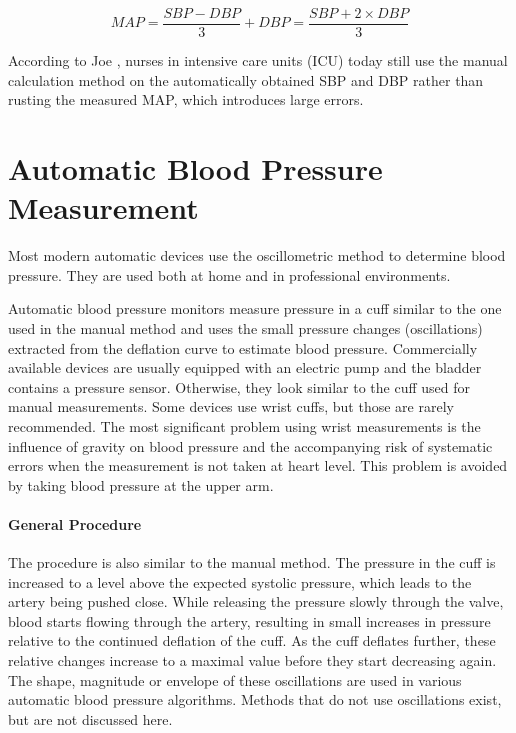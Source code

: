 \begin{equation}
\label{eq:MAP}
MAP = \frac{SBP-DBP}{3}+DBP = \frac{SBP+2\times DBP}{3}
\end{equation}

According to Joe \cite{Joe2019}, nurses in intensive care units (ICU) today still use the manual calculation method on the automatically obtained SBP and DBP rather than rusting the measured MAP, which introduces large errors.

\section{Automatic Blood Pressure Measurement}

Most modern automatic devices use the oscillometric method to determine blood pressure. They are used both at home and in professional environments.

Automatic blood pressure monitors measure pressure in a cuff similar to the one used in the manual method and uses the small pressure changes (oscillations) extracted from the deflation curve to estimate blood pressure. Commercially available devices are usually equipped with an electric pump and the bladder contains a pressure sensor. Otherwise, they look similar to the cuff used for manual measurements. Some devices use wrist cuffs, but those are rarely recommended. \cite{BIHS2020} The most significant problem using wrist measurements is the influence of gravity on blood pressure and the accompanying risk of systematic errors when the measurement is not taken at heart level. \cite{Boron2012} This problem is avoided by taking blood pressure at the upper arm.

\paragraph{General Procedure} The procedure is also similar to the manual method. The pressure in the cuff is increased to a level above the expected systolic pressure, which leads to the artery being pushed close. While releasing the pressure slowly through the valve, blood starts flowing through the artery, resulting in small increases in pressure relative to the continued deflation of the cuff. As the cuff deflates further, these relative changes increase to a maximal value before they start decreasing again.\cite{Forouzanfar2015,Drzewiecki1994,Ursino1996} The shape, magnitude or envelope of these oscillations are used in various automatic blood pressure algorithms. Methods that do not use oscillations exist, but are not discussed here. 


